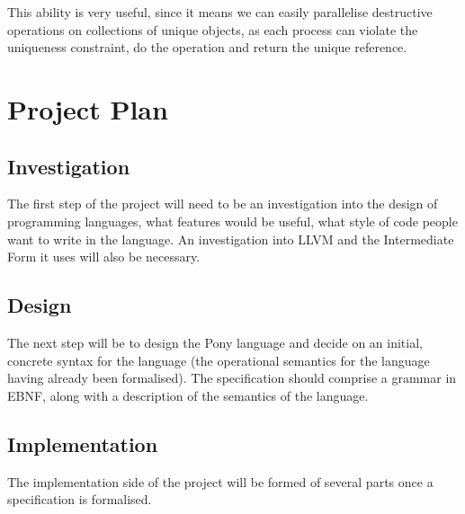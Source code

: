 \documentclass{article}
\begin{document}
This ability is very useful, since it means we can easily parallelise destructive operations on 
collections of unique objects, as each process can violate the uniqueness constraint, do the
operation and return the unique reference.

\section{Project Plan}

\subsection{Investigation}
The first step of the project will need to be an investigation into the design of programming
languages, what features would be useful, what style of code people want to write in the
language. An investigation into LLVM and the Intermediate Form it uses will also be necessary.

\subsection{Design}
The next step will be to design the Pony language and decide on an initial,
concrete syntax for the language (the operational semantics for the language having 
already been formalised). The specification should comprise a grammar in EBNF, along
with a description of the semantics of the language.
\subsection{Implementation}
The implementation side of the project will be formed of several parts once a specification is formalised.
\end{document}
